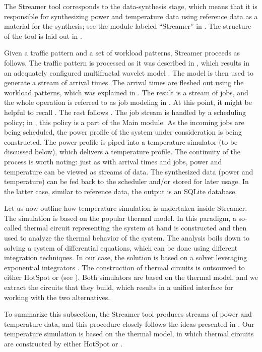 
The Streamer tool corresponds to the data-synthesis stage, which means that it
is responsible for synthesizing power and temperature data using reference data
as a material for the synthesis; see the module labeled ``Streamer'' in
. The structure of the tool is laid out in .

Given a traffic pattern and a set of workload patterns, Streamer proceeds as
follows. The traffic pattern is processed as it was described in ,
which results in an adequately configured multifractal wavelet model
\cite{riedi1999}. The model is then used to generate a stream of arrival times.
The arrival times are fleshed out using the workload patterns, which was
explained in . The result is a stream of jobs, and the whole
operation is referred to as job modeling in . At this point, it
might be helpful to recall . The rest follows .
The job stream is handled by a scheduling policy; in , this
policy is a part of the Main module. As the incoming jobs are being scheduled,
the power profile of the system under consideration is being constructed. The
power profile is piped into a temperature simulator (to be discussed below),
which delivers a temperature profile. The continuity of the process is worth
noting: just as with arrival times and jobs, power and temperature can be viewed
as streams of data. The synthesized data (power and temperature) can be fed back
to the scheduler and/or stored for later usage. In the latter case, similar to
reference data, the output is an SQLite database.

Let us now outline how temperature simulation is undertaken inside Streamer. The
simulation is based on the popular thermal  model. In this paradigm, a
so-called thermal  circuit representing the system at hand is constructed
and then used to analyze the thermal behavior of the system. The analysis boils
down to solving a system of differential equations, which can be done using
different integration techniques. In our case, the solution is based on a solver
leveraging exponential integrators \cite{hochbruck2010, ukhov2014}. The
construction of thermal circuits is outsourced to either HotSpot
\cite{skadron2004} or  \cite{sridhar2010} (see ). Both
simulators are based on the thermal  model, and we extract the circuits
that they build, which results in a unified interface for working with the two
alternatives.

To summarize this subsection, the Streamer tool produces streams of power and
temperature data, and this procedure closely follows the ideas presented in
. Our temperature simulation is based on the thermal 
model, in which thermal circuits are constructed by either HotSpot or
.
